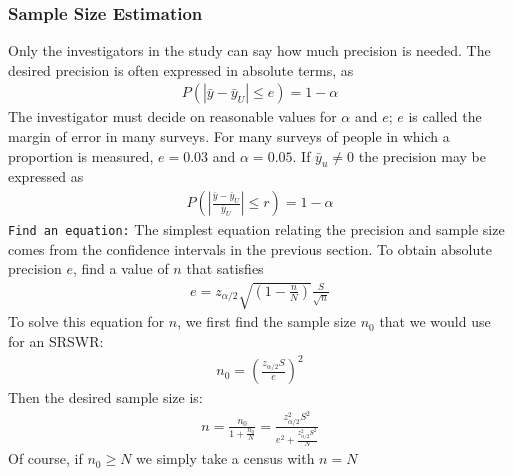\documentclass[a4paper,twoside,11pt]{article}
\begin{document}
\subsubsection{Sample Size Estimation}
Only the investigators in the study can say how much precision is needed. The desired precision is often expressed in absolute terms, as
\begin{equation*}
\begin{aligned}
P(|\bar{y} - \bar{y}_U| \le e) = 1-\alpha
\end{aligned}
\end{equation*}
The investigator must decide on reasonable values for $\alpha$ and $e$; $e$ is called the margin of error in many surveys. For many surveys of people in which a proportion is measured, $e=0.03$ and $\alpha=0.05$.
\newline
If $\bar{y}_u \ne 0$ the precision may be expressed as 
\begin{equation*}
\begin{aligned}
P(|\frac{\bar{y}-\bar{y}_U}{\bar{y}_U}| \le r ) = 1- \alpha
\end{aligned}
\end{equation*}
\newline
\newline
\texttt{Find an equation:} The simplest equation relating the precision and sample size comes from the confidence intervals in the previous section. To obtain absolute precision $e$, find a value of $n$ that satisfies
\begin{equation*}
\begin{aligned}
e = z_{\alpha/2}\sqrt{(1-\frac{n}{N})} \frac{S}{\sqrt{n}}
\end{aligned}
\end{equation*}
To solve this equation for $n$, we first find the sample size $n_0$ that we would use for an SRSWR:
\begin{equation*}
\begin{aligned}
n_0 = (\frac{z_{\alpha/2}S}{e})^2
\end{aligned}
\end{equation*}
Then the desired sample size is:
\begin{equation*}
\begin{aligned}
n = \frac{n_0}{1+ \frac{n_0}{N}} = \frac{z_{\alpha/2}^2 S^2}{e^2 + \frac{z_{\alpha/2}^2 S^2}{N}}
\end{aligned}
\end{equation*}
Of course, if $n_0 \ge N$ we simply take a census with $n=N$
\end{document}
